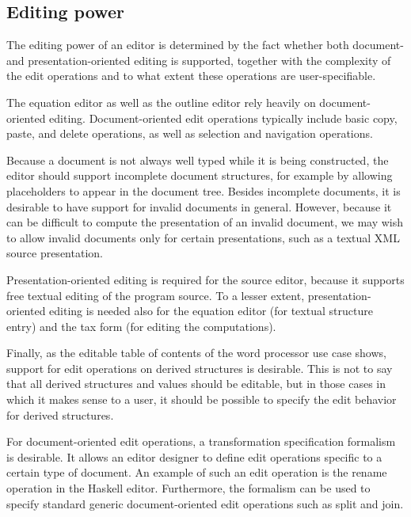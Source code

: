 \documentclass{speauth}
\begin{document}
\subsection{Editing power} \label{sect:editingPower}

The editing power of an editor is determined by the fact whether both document- and presentation-oriented editing is supported, together with the complexity of the edit operations and to what extent these operations are user-specifiable. 


The equation editor as well as the outline editor rely heavily on document-oriented editing. Document-oriented edit operations typically include basic copy, paste, and delete operations, as well as selection and navigation operations.

Because a document is not always well typed while it is being constructed, the editor should support incomplete document structures, for example by allowing placeholders to appear in the document tree. Besides incomplete documents, it is desirable to have support for invalid documents in general. However, because it can be difficult to compute the presentation of an invalid document, we may wish to allow invalid documents only for certain presentations, such as a textual XML source presentation. 

Presentation-oriented editing is required for the source editor, because it supports free textual editing of the program source. To a lesser extent, presentation-oriented editing is needed also for the equation editor (for textual structure entry) and the tax form (for editing the computations). 

Finally, as the editable table of contents of the word processor use case shows, support for edit operations on derived structures is desirable. This is not to say that all derived structures and values should be editable, but in those cases in which it makes sense to a user, it should be possible to specify the edit behavior for derived structures.

For document-oriented edit operations, a transformation specification formalism is desirable. It allows an editor designer to define edit operations specific to a certain type of document. An example of such an edit operation is the rename operation in the Haskell editor. Furthermore, the formalism can be used to specify standard generic document-oriented edit operations such as split and join.
									
\end{document}
